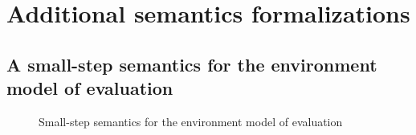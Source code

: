 \section{Additional semantics formalizations}
\label{app:additional_rules}

\subsection{A small-step semantics for the environment model of evaluation}
\label{sec:small-step-evalenv}

\begin{figure}
  \centering
  \begin{mdframed}
    \begin{singlespace}
      
    \end{singlespace}
  \end{mdframed}
  \caption{Small-step semantics for the environment model of evaluation}
  \label{fig:small-step-rules}
\end{figure}


